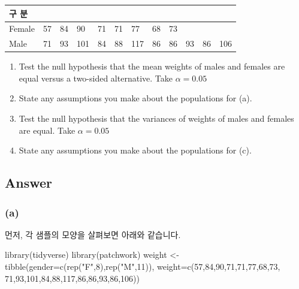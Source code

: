 \documentclass[
  a4paper,
  DIV=11,
  numbers=noendperiod]{scrreprt}
\newenvironment{Shaded}{\begin{snugshade}}{\end{snugshade}}
\newcommand{\AttributeTok}[1]{\textcolor[rgb]{0.40,0.45,0.13}{#1}}
\newcommand{\DecValTok}[1]{\textcolor[rgb]{0.68,0.00,0.00}{#1}}
\newcommand{\FunctionTok}[1]{\textcolor[rgb]{0.28,0.35,0.67}{#1}}
\newcommand{\NormalTok}[1]{\textcolor[rgb]{0.00,0.23,0.31}{#1}}
\newcommand{\OtherTok}[1]{\textcolor[rgb]{0.00,0.23,0.31}{#1}}
\newcommand{\StringTok}[1]{\textcolor[rgb]{0.13,0.47,0.30}{#1}}
\begin{document}
\begin{longtable}[]{@{}llllllllllll@{}}
\toprule\noalign{}
구 분 & & & & & & & & & & & \\
\midrule\noalign{}
\endhead
\bottomrule\noalign{}
\endlastfoot
Female & 57 & 84 & 90 & 71 & 71 & 77 & 68 & 73 & & & \\
Male & 71 & 93 & 101 & 84 & 88 & 117 & 86 & 86 & 93 & 86 & 106 \\
\end{longtable}

\begin{enumerate}
\def\labelenumi{(\alph{enumi})}
\item
  Test the null hypothesis that the mean weights of males and females
  are equal versus a two-sided alternative. Take \(\alpha=0.05\)
\item
  State any assumptions you make about the populations for (a).
\item
  Test the null hypothesis that the variances of weights of males and
  females are equal. Take \(\alpha=0.05\)
\item
  State any assumptions you make about the populations for (c).
\end{enumerate}

\subsection*{Answer}\label{answer-30}

\subsubsection*{(a)}\label{a-4}

먼저, 각 샘플의 모양을 살펴보면 아래와 같습니다.

\begin{Shaded}
\begin{Highlighting}[]
\FunctionTok{library}\NormalTok{(tidyverse)}
\FunctionTok{library}\NormalTok{(patchwork)}
\NormalTok{weight }\OtherTok{\textless{}{-}} \FunctionTok{tibble}\NormalTok{(}\AttributeTok{gender=}\FunctionTok{c}\NormalTok{(}\FunctionTok{rep}\NormalTok{(}\StringTok{"F"}\NormalTok{,}\DecValTok{8}\NormalTok{),}\FunctionTok{rep}\NormalTok{(}\StringTok{"M"}\NormalTok{,}\DecValTok{11}\NormalTok{)),}
                 \AttributeTok{weight=}\FunctionTok{c}\NormalTok{(}\DecValTok{57}\NormalTok{,}\DecValTok{84}\NormalTok{,}\DecValTok{90}\NormalTok{,}\DecValTok{71}\NormalTok{,}\DecValTok{71}\NormalTok{,}\DecValTok{77}\NormalTok{,}\DecValTok{68}\NormalTok{,}\DecValTok{73}\NormalTok{,}
                          \DecValTok{71}\NormalTok{,}\DecValTok{93}\NormalTok{,}\DecValTok{101}\NormalTok{,}\DecValTok{84}\NormalTok{,}\DecValTok{88}\NormalTok{,}\DecValTok{117}\NormalTok{,}\DecValTok{86}\NormalTok{,}\DecValTok{86}\NormalTok{,}\DecValTok{93}\NormalTok{,}\DecValTok{86}\NormalTok{,}\DecValTok{106}\NormalTok{))}
\end{Highlighting}
\end{Shaded}
\end{document}
